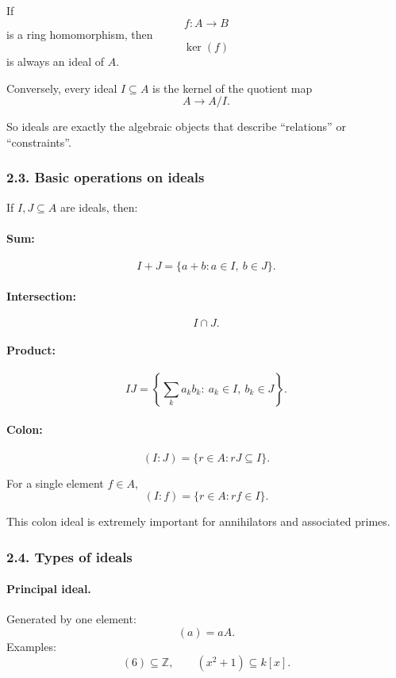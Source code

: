 \documentclass[12pt,a4paper]{article}
\theoremstyle{plain}
\theoremstyle{definition}      %
\begin{document}
	If
	\[
	f:A\to B
	\]
	is a ring homomorphism, then
	\[
	\ker(f)
	\]
	is always an ideal of \(A\).
	
	Conversely, every ideal \(I\subseteq A\) is the kernel of the quotient map
	\[
	A\to A/I.
	\]
	
	So ideals are exactly the algebraic objects that describe ``relations'' or ``constraints''.
	
	\subsubsection*{2.3. Basic operations on ideals}
	
	If \(I,J\subseteq A\) are ideals, then:
	
	\paragraph{Sum:}
	\[
	I+J=\{a+b:a\in I,\ b\in J\}.
	\]
	
	\paragraph{Intersection:}
	\[
	I\cap J.
	\]
	
	\paragraph{Product:}
	\[
	IJ=\left\{\sum_k a_kb_k:\ a_k\in I,\ b_k\in J\right\}.
	\]
	
	\paragraph{Colon:}
	\[
	(I:J)=\{r\in A:rJ\subseteq I\}.
	\]
	
	For a single element \(f\in A\),
	\[
	(I:f)=\{r\in A:rf\in I\}.
	\]
	
	This colon ideal is extremely important for annihilators and associated primes.
	
	\subsubsection*{2.4. Types of ideals}
	
	\paragraph{Principal ideal.}
	Generated by one element:
	\[
	(a)=aA.
	\]
	Examples:
	\[
	(6)\subseteq \mathbb Z,\qquad (x^2+1)\subseteq k[x].
	\]
	
\end{document}
